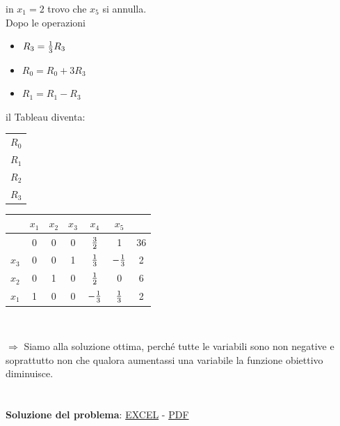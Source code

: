\documentclass[12pt,a4paper]{article}
\begin{document}
in $x_1=2$ trovo che $x_5$ si annulla.\\
Dopo le operazioni \begin{itemize}
\item $R_3 = {1\over 3}R_3$
\item $R_0 = R_0 + 3R_3$
\item $R_1 = R_1 - R_3$
\end{itemize} il Tableau diventa:
\begin{center}
\begin{tabular}{c}
\\
$R_0$\\
$R_1$\\
$R_2$\\
$R_3$\\
\end{tabular}
\begin{tabular}{r|ccccc|c|}
& $x_1$ & $x_2$ & $x_3$ & $x_4$ & $x_5$\\
 \hline
& 0 & 0 & 0 & ${3\over2}$ & 1 & 36\\
$x_3$ & 0 & 0 & 1 & ${1\over3}$ & $-{1\over3}$ & 2\\
$x_2$ & 0 & 1 & 0 & ${1\over2}$ & 0 & 6\\
$x_1$ & 1 & 0 & 0 & $-{1\over3}$ & ${1\over3}$ & 2\\
\end{tabular}\\
\end{center}
$\Longrightarrow$ Siamo alla soluzione ottima, perché tutte le variabili sono non negative e soprattutto non che qualora aumentassi una variabile la funzione obiettivo diminuisce.\\
\\
\\
\textbf{Soluzione del problema}: \href{https://units.enricolacchin.com/ricop21/problema_211014.xlsx}{EXCEL} - \href{https://units.enricolacchin.com/ricop21/problema_211014.pdf}{PDF}

\clearpage
\end{document}
